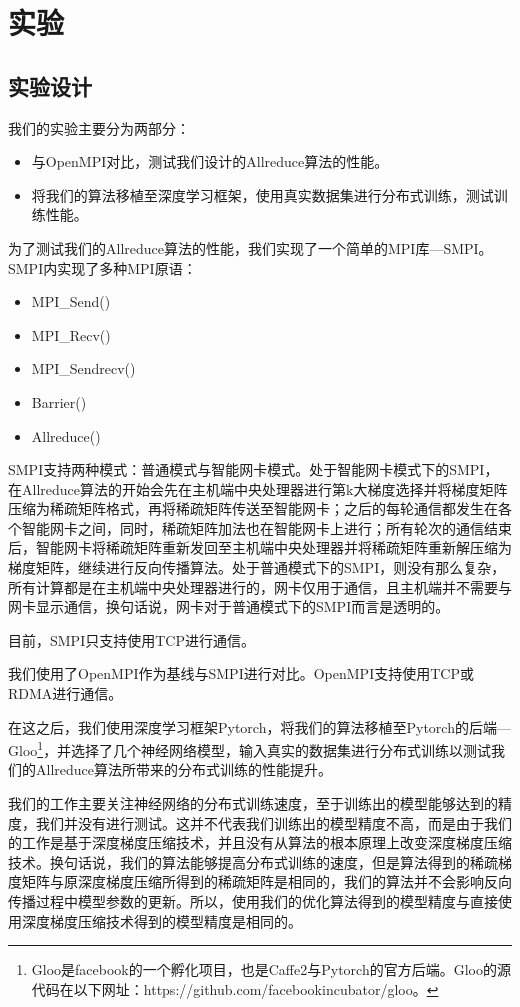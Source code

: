 \chapter{实验}
\label{chap4}

\section{实验设计}
我们的实验主要分为两部分：
\begin{itemize}
    \item 与OpenMPI对比，测试我们设计的Allreduce算法的性能。
    \item 将我们的算法移植至深度学习框架，使用真实数据集进行分布式训练，测试训练性能。
\end{itemize}

为了测试我们的Allreduce算法的性能，我们实现了一个简单的MPI库---SMPI。SMPI内实现了多种MPI原语：
\begin{itemize}
    \item MPI\_Send()
    \item MPI\_Recv()
    \item MPI\_Sendrecv()
    \item Barrier()
    \item Allreduce()
\end{itemize}

SMPI支持两种模式：普通模式与智能网卡模式。处于智能网卡模式下的SMPI，在Allreduce算法的开始会先在主机端中央处理器进行第k大梯度选择并将梯度矩阵压缩为稀疏矩阵格式，再将稀疏矩阵传送至智能网卡；之后的每轮通信都发生在各个智能网卡之间，同时，稀疏矩阵加法也在智能网卡上进行；所有轮次的通信结束后，智能网卡将稀疏矩阵重新发回至主机端中央处理器并将稀疏矩阵重新解压缩为梯度矩阵，继续进行反向传播算法。处于普通模式下的SMPI，则没有那么复杂，所有计算都是在主机端中央处理器进行的，网卡仅用于通信，且主机端并不需要与网卡显示通信，换句话说，网卡对于普通模式下的SMPI而言是透明的。

目前，SMPI只支持使用TCP进行通信。

我们使用了OpenMPI作为基线与SMPI进行对比。OpenMPI支持使用TCP或RDMA进行通信。

在这之后，我们使用深度学习框架Pytorch，将我们的算法移植至Pytorch的后端---Gloo\footnote{Gloo是facebook的一个孵化项目，也是Caffe2与Pytorch的官方后端。Gloo的源代码在以下网址：https://github.com/facebookincubator/gloo。}，并选择了几个神经网络模型，输入真实的数据集进行分布式训练以测试我们的Allreduce算法所带来的分布式训练的性能提升。

我们的工作主要关注神经网络的分布式训练速度，至于训练出的模型能够达到的精度，我们并没有进行测试。这并不代表我们训练出的模型精度不高，而是由于我们的工作是基于深度梯度压缩技术，并且没有从算法的根本原理上改变深度梯度压缩技术。换句话说，我们的算法能够提高分布式训练的速度，但是算法得到的稀疏梯度矩阵与原深度梯度压缩所得到的稀疏矩阵是相同的，我们的算法并不会影响反向传播过程中模型参数的更新。所以，使用我们的优化算法得到的模型精度与直接使用深度梯度压缩技术得到的模型精度是相同的。

